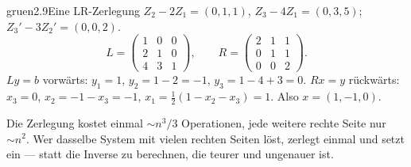 \begin{loesungkarte}{gruen}{2.9}{Eine LR-Zerlegung}
$Z_2 - 2Z_1 = (0, 1, 1)$, $Z_3 - 4Z_1 = (0, 3, 5)$; $Z_3' - 3Z_2' = (0, 0, 2)$.
\[ L = \begin{pmatrix}1 & 0 & 0\\ 2 & 1 & 0\\ 4 & 3 & 1\end{pmatrix},\qquad R = \begin{pmatrix}2 & 1 & 1\\ 0 & 1 & 1\\ 0 & 0 & 2\end{pmatrix}. \]
$Ly = b$ vorwärts: $y_1 = 1$, $y_2 = 1 - 2 = -1$, $y_3 = 1 - 4 + 3 = 0$. $Rx = y$ rückwärts: $x_3 = 0$, $x_2 = -1 - x_3 = -1$, $x_1 = \frac12(1 - x_2 - x_3) = 1$. Also $x = (1, -1, 0)$.
\begin{mitnehmen}\kastentext
Die Zerlegung kostet einmal $\sim n^{3}/3$ Operationen, jede weitere rechte Seite nur $\sim n^{2}$. Wer dasselbe System mit vielen rechten Seiten löst, zerlegt einmal und setzt ein --- statt die Inverse zu berechnen, die teurer und ungenauer ist.
\end{mitnehmen}
\end{loesungkarte}

